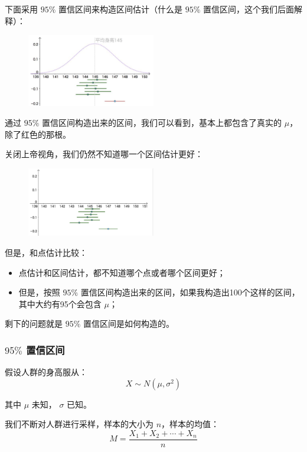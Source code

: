 \documentclass[12pt]{article}
\begin{document}
下面采用 $95\%$ 置信区间来构造区间估计（什么是 $95\%$  置信区间，这个我们后面解释）：
\begin{figure}[H]
    \centering
    \includegraphics[width=0.5\textwidth]{fig/Confidence_Interval_Example_5.png}
\end{figure}

通过 $95\%$ 置信区间构造出来的区间，我们可以看到，基本上都包含了真实的 $\mu$，除了红色的那根。

关闭上帝视角，我们仍然不知道哪一个区间估计更好：
\begin{figure}[H]
    \centering
    \includegraphics[width=0.5\textwidth]{fig/Confidence_Interval_Example_6.png}
\end{figure}

但是，和点估计比较：
\begin{itemize}
\setlength{\itemsep}{0pt}
\setlength{\parsep}{0pt}
\setlength{\parskip}{0pt}
    \item 点估计和区间估计，都不知道哪个点或者哪个区间更好；
    \item 但是，按照 $95\%$ 置信区间构造出来的区间，如果我构造出100个这样的区间，其中大约有95个会包含 $\mu$；
\end{itemize}

剩下的问题就是 $95\%$ 置信区间是如何构造的。

\subsubsection{ $95\%$ 置信区间}
假设人群的身高服从：
$$
X \sim N(\mu, \sigma^2)
$$

其中  $\mu$ 未知， $\sigma$ 已知。

我们不断对人群进行采样，样本的大小为 $n$，样本的均值：
$$
M = \frac{X_1 + X_2 + \cdots + X_n}{n}
$$
\end{document}
